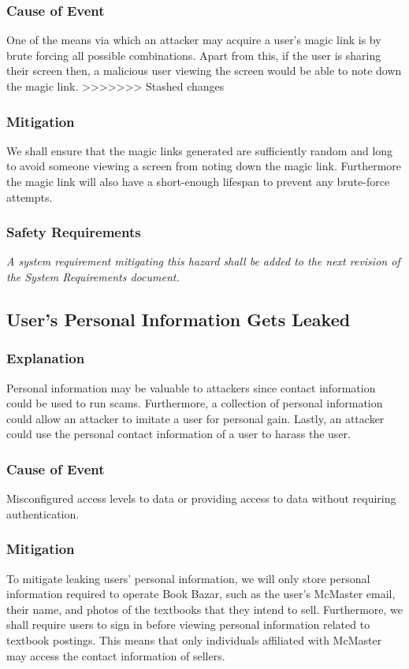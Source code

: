 \documentclass[fullpage]{article}
\begin{document}
\subsubsection*{Cause of Event}
One of the means via which an attacker may acquire a user's magic link is by brute forcing all possible combinations. Apart from this, if the user is sharing their screen then, a malicious user viewing the screen would be able to note down the magic link.
>>>>>>> Stashed changes

\subsubsection*{Mitigation}
We shall ensure that the magic links generated are sufficiently random and long to avoid someone viewing a screen from noting down the magic link. Furthermore the magic link will also have a short-enough lifespan to prevent any brute-force attempts.
\subsubsection*{Safety Requirements}
\emph{A system requirement mitigating this hazard shall be added to the next revision of the System Requirements document.}

\subsection{User's Personal Information Gets Leaked}

\subsubsection*{Explanation}
Personal information may be valuable to attackers since contact information could be used to run scams. Furthermore, a collection of personal information could allow an attacker to imitate a user for personal gain. Lastly, an attacker could use the personal contact information of a user to harass the user.

\subsubsection*{Cause of Event}
Misconfigured access levels to data or providing access to data without requiring authentication.

\subsubsection*{Mitigation}
To mitigate leaking users’ personal information, we will only store personal information required to operate Book Bazar, such as the user’s McMaster email, their name, and photos of the textbooks that they intend to sell. Furthermore, we shall require users to sign in before viewing personal information related to textbook postings. This means that only individuals affiliated with McMaster may access the contact information of sellers.
\end{document}
